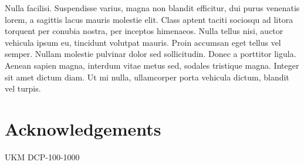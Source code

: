 \documentclass[onecolumn]{article}
\begin{document}
Nulla facilisi. Suspendisse varius, magna non blandit efficitur, dui purus
venenatis lorem, a sagittis lacus mauris molestie elit. Class aptent taciti
sociosqu ad litora torquent per conubia nostra, per inceptos himenaeos.
Nulla tellus nisi, auctor vehicula ipsum eu, tincidunt volutpat mauris.
Proin accumsan eget tellus vel semper. Nullam molestie pulvinar dolor sed
sollicitudin. Donec a porttitor ligula. Aenean sapien magna, interdum vitae
metus sed, sodales tristique magna. Integer sit amet dictum diam. Ut mi
nulla, ullamcorper porta vehicula dictum, blandit vel turpis.
    
\section*{Acknowledgements} UKM DCP-100-1000
    



\end{document}
